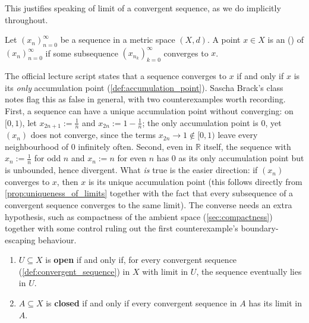 This justifies speaking of  limit of a convergent sequence, as we do implicitly
throughout.

\begin{definition}
\label{def:accumulation_point}
Let $(x_n)_{n=0}^{\infty}$ be a sequence in a metric space $(X,d)$. A point $x \in X$ is an
 () of $(x_n)_{n=0}^{\infty}$ if some
subsequence $(x_{n_k})_{k=0}^{\infty}$ converges to $x$.
\end{definition}

\begin{remark}
The official lecture script states that a sequence converges to $x$ if and only if $x$ is its
\emph{only} accumulation point (\cref{def:accumulation_point}). Sascha Brack's class notes flag
this as false in general, with two counterexamples worth recording. First, a sequence can have a
unique accumulation point without converging: on $[0,1)$, let $x_{2n+1} := \tfrac1n$ and
$x_{2n} := 1-\tfrac1n$; the only accumulation point is $0$, yet $(x_n)$ does not converge, since
the terms $x_{2n} \to 1 \notin [0,1)$ leave every neighbourhood of $0$ infinitely often. Second,
even in $\mathbb{R}$ itself, the sequence with $x_n := \tfrac1n$ for odd $n$ and $x_n := n$ for
even $n$ has $0$ as its only accumulation point but is unbounded, hence divergent. What \emph{is}
true is the easier direction: if $(x_n)$ converges to $x$, then $x$ is its unique accumulation
point (this follows directly from \cref{prop:uniqueness_of_limits} together with the fact that
every subsequence of a convergent sequence converges to the same limit). The converse needs an
extra hypothesis, such as compactness of the ambient space (\cref{sec:compactness}) together with
some control ruling out the first counterexample's boundary-escaping behaviour.
\end{remark}

\begin{proposition}
\label{prop:open_closed_via_sequences}
\begin{enumerate}[label=\textbf{(\alph*)}]
  \item $U \subseteq X$ is \textbf{open} if and only if, for every convergent sequence
    (\cref{def:convergent_sequence}) in $X$ with limit in $U$, the sequence eventually lies in
    $U$.
  \item $A \subseteq X$ is \textbf{closed} if and only if every convergent sequence in $A$ has its
    limit in $A$.
\end{enumerate}
\end{proposition}

